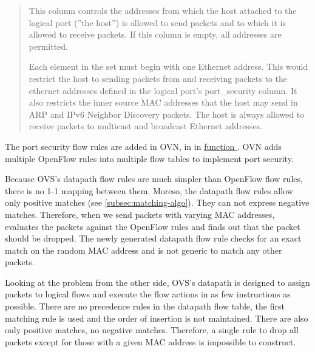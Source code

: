 \begin{quote}
    This column controls the addresses from which the host
    attached to the logical port (''the host'') is allowed to
    send packets and to which it is allowed to receive
    packets. If this column is empty, all addresses are
    permitted.

    Each element in the set must begin with one Ethernet
    address. This would restrict the host to sending packets
    from and receiving packets to the ethernet addresses
    defined in the logical port's port\_security column. It
    also restricts the inner source MAC addresses that the
    host may send in ARP and IPv6 Neighbor Discovery packets.
    The host is always allowed to receive packets to multicast
    and broadcast Ethernet addresses.
\end{quote}

The port security flow rules are added in OVN, in  in \href{https://github.com/ovn-org/ovn/blob/45bf9ed9dd2070a458bf384ce529e9ef62f26bd5/controller/lflow.c\#L3091-L3093}{function }. OVN adds multiple OpenFlow rules into multiple flow tables to implement port security.

Because OVS's datapath flow rules are much simpler than OpenFlow flow rules, there is no 1-1 mapping between them. Moreso, the datapath flow rules allow only positive matches (see \cref{subsec:matching-algo}). They can not express negative matches. Therefore, when we send packets with varying MAC addresses,  evaluates the packets against the OpenFlow rules and finds out that the packet should be dropped. The newly generated datapath flow rule checks for an exact match on the random MAC address and is not generic to match any other packets.

Looking at the problem from the other side, OVS's datapath is designed to assign packets to logical flows and execute the flow actions in as few instructions as possible. There are no precedence rules in the datapath flow table, the first matching rule is used and the order of insertion is not maintained. There are also only positive matches, no negative matches. Therefore, a single rule to drop all packets except for those with a given MAC address is impossible to construct.



